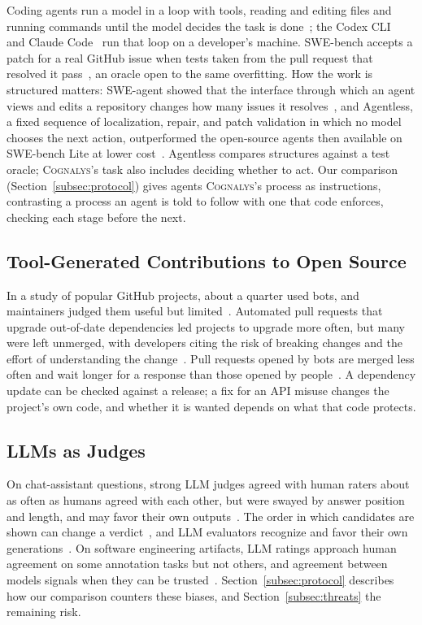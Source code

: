 \documentclass[conference]{IEEEtran}
\newcommand{\system}{\textsc{Cognalys}}
\begin{document}
Coding agents run a model in a loop with tools, reading and editing files and
running commands until the model decides the task is
done~\cite{yang2024sweagent}; the Codex CLI~\cite{openai2026codex} and Claude
Code~\cite{anthropic2026claudecode} run that loop on a developer's machine.
SWE-bench accepts a patch for a real GitHub issue when tests taken from the
pull request that resolved it pass~\cite{jimenez2024swebench}, an oracle open
to the same overfitting. How the work is structured matters: SWE-agent showed
that the interface through which an agent views and edits a repository changes
how many issues it resolves~\cite{yang2024sweagent}, and Agentless, a fixed
sequence of localization, repair, and patch validation in which no model
chooses the next action, outperformed the open-source agents then available on
SWE-bench Lite at lower cost~\cite{xia2025agentless}. Agentless compares
structures against a test oracle; \system{}'s task also includes deciding
whether to act. Our comparison (Section~\ref{subsec:protocol}) gives agents
\system{}'s process as instructions, contrasting a process an agent is told to
follow with one that code enforces, checking each stage before the next.

\subsection{Tool-Generated Contributions to Open Source}
\label{subsec:bots}

In a study of popular GitHub projects, about a quarter used bots, and
maintainers judged them useful but limited~\cite{wessel2018bots}. Automated
pull requests that upgrade out-of-date dependencies led projects to upgrade
more often, but many were left unmerged, with developers citing the risk of
breaking changes and the effort of understanding the
change~\cite{mirhosseini2017autopr}. Pull requests opened by bots are merged
less often and wait longer for a response than those opened by
people~\cite{wyrich2021botprs}. A dependency update can be checked against a
release; a fix for an API misuse changes the project's own code, and whether it
is wanted depends on what that code protects.

\subsection{LLMs as Judges}
\label{subsec:judges-bg}

On chat-assistant questions, strong LLM judges agreed with human raters about
as often as humans agreed with each other, but were swayed by answer
position and length, and may favor their own outputs~\cite{zheng2023judge}. The order in which
candidates are shown can change a verdict~\cite{wang2024fair}, and LLM
evaluators recognize and favor their own
generations~\cite{panickssery2024selfpref}. On software engineering artifacts,
LLM ratings approach human agreement on some annotation tasks but not others,
and agreement between models signals when they can be
trusted~\cite{ahmed2025annotation}. Section~\ref{subsec:protocol} describes how our comparison counters these
biases, and Section~\ref{subsec:threats} the remaining risk.
\end{document}
